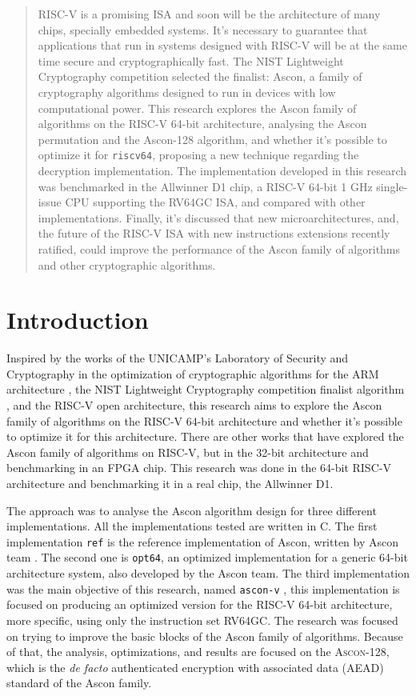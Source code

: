 \documentclass[11pt,twoside]{article}
\begin{document}
\begin{abstract}
  RISC-V is a promising ISA and soon will be the architecture of many chips, specially embedded systems. It's necessary to guarantee that applications that run in systems designed with RISC-V will be at the same time secure and cryptographically fast. The NIST Lightweight Cryptography competition selected the finalist: Ascon, a family of cryptography algorithms designed to run in devices with low computational power. This research explores the Ascon family of algorithms on the RISC-V 64-bit architecture, analysing the Ascon permutation and the Ascon-128 algorithm, and whether it's possible to optimize it for \texttt{riscv64}, proposing a new technique regarding the decryption implementation. The implementation developed in this research was benchmarked in the Allwinner D1 chip, a RISC-V 64-bit 1 GHz single-issue CPU supporting the RV64GC ISA, and compared with other implementations. Finally, it's discussed that new microarchitectures, and, the future of the RISC-V ISA with new instructions extensions recently ratified, could improve the performance of the Ascon family of algorithms and other cryptographic algorithms.
\end{abstract}

\section{Introduction}
Inspired by the works of the UNICAMP's Laboratory of Security and Cryptography in the optimization of cryptographic algorithms for the ARM architecture \cite{Fujii2017a}, the NIST Lightweight Cryptography competition finalist algorithm \cite{turan2023status}, and the RISC-V open architecture, this research aims to explore the Ascon family of algorithms \cite{asconv12nist} on the RISC-V 64-bit architecture and whether it's possible to optimize it for this architecture. There are other works that have explored the Ascon family of algorithms on RISC-V, but in the 32-bit architecture and benchmarking in an FPGA chip. This research was done in the 64-bit RISC-V architecture and benchmarking it in a real chip, the Allwinner D1.

The approach was to analyse the Ascon algorithm design for three different implementations. All the implementations tested are written in C. The first implementation \texttt{ref} is the reference implementation of Ascon, written by Ascon team \cite{asconc2023}. The second one is \texttt{opt64}, an optimized implementation for a generic 64-bit architecture system, also developed by the Ascon team. The  third implementation was the main objective of this research, named \texttt{ascon-v} \cite{asconv2023}, this implementation is focused on producing an optimized version for the RISC-V 64-bit architecture, more specific, using only the instruction set \textsf{RV64GC}. The research was focused on trying to improve the basic blocks of the Ascon family of algorithms. Because of that, the analysis, optimizations, and results are focused on the \textsc{Ascon-128}, which is the \textit{de facto} authenticated encryption with associated data (AEAD) standard of the Ascon family.
\end{document}

